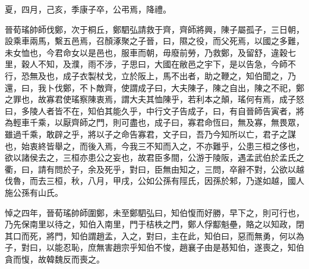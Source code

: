 \begin{pinyinscope}
夏，四月，己亥，季康子卒，公弔焉，降禮。

晉荀瑤帥師伐鄭，次于桐丘，鄭駟弘請救于齊，齊師將興，陳子屬孤子，三日朝，設乘車兩馬，繫五邑焉，召顏涿聚之子晉，曰，隰之役，而父死焉，以國之多難，未女恤也，今君命女以是邑也，服車而朝，毋廢前勞，乃救鄭，及留舒，違穀七里，穀人不知，及濮，雨不涉，子思曰，大國在敝邑之宇下，是以告急，今師不行，恐無及也，成子衣製杖戈，立於阪上，馬不出者，助之鞭之，知伯聞之，乃還，曰，我卜伐鄭，不卜敵齊，使謂成子曰，大夫陳子，陳之自出，陳之不祀，鄭之罪也，故寡君使瑤察陳衷焉，謂大夫其恤陳乎，若利本之顛，瑤何有焉，成子怒曰，多陵人者皆不在，知伯其能久乎，中行文子告成子，曰，有自晉師告寅者，將為輕車千乘，以厭齊師之門，則可盡也，成子曰，寡君命恆曰，無及寡，無畏眾，雖過千乘，敢辟之乎，將以子之命告寡君，文子曰，吾乃今知所以亡，君子之謀也，始衷終皆舉之，而後入焉，今我三不知而入之，不亦難乎，公患三桓之侈也，欲以諸侯去之，三桓亦患公之妄也，故君臣多間，公游于陵阪，遇孟武伯於孟氏之衢，曰，請有問於子，余及死乎，對曰，臣無由知之，三問，卒辭不對，公欲以越伐魯，而去三桓，秋，八月，甲戌，公如公孫有陘氏，因孫於邾，乃遂如越，國人施公孫有山氏。

悼之四年，晉荀瑤帥師圍鄭，未至鄭駟弘曰，知伯愎而好勝，早下之，則可行也，乃先保南里以待之，知伯入南里，門于桔柣之門，鄭人俘酅魁壘，賂之以知政，閉其口而死，將門，知伯謂趙孟，入之，對曰，主在此，知伯曰，惡而無勇，何以為子，對曰，以能忍恥，庶無害趙宗乎知伯不悛，趙襄子由是惎知伯，遂喪之，知伯貪而愎，故韓魏反而喪之。


\end{pinyinscope}